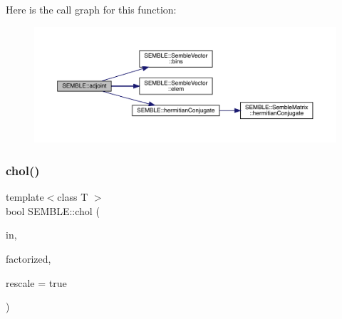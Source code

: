 Here is the call graph for this function\+:
\nopagebreak
\begin{figure}[H]
\begin{center}
\leavevmode
\includegraphics[width=350pt]{d7/dfd/namespaceSEMBLE_ada777a6c4fd2b3433988da08715101a7_cgraph}
\end{center}
\end{figure}
\mbox{\label{namespaceSEMBLE_af183367741f8d2609dd572702f7b4347}} 
\subsubsection{\texorpdfstring{chol()}{chol()}}
{\footnotesize\ttfamily template$<$class T $>$ \\
bool S\+E\+M\+B\+L\+E\+::chol (\begin{DoxyParamCaption}\item[{const \mbox{\hyperlink{structSEMBLE_1_1SembleMatrix}{Semble\+Matrix}}$<$ T $>$ \&}]{in,  }\item[{\mbox{\hyperlink{structSEMBLE_1_1SembleMatrix}{Semble\+Matrix}}$<$ T $>$ \&}]{factorized,  }\item[{bool}]{rescale = {\ttfamily true} }\end{DoxyParamCaption})}

